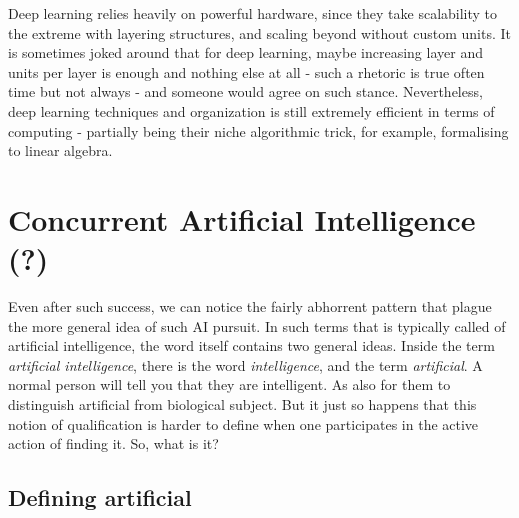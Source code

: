 Deep learning relies heavily on powerful hardware, since they take scalability to the extreme with layering structures, and scaling beyond without custom units. It is sometimes joked around that for deep learning, maybe increasing layer and units per layer is enough and nothing else at all - such a rhetoric is true often time but not always - and someone would agree on such stance. Nevertheless, deep learning techniques and organization is still extremely efficient in terms of computing - partially being their niche algorithmic trick, for example, formalising to linear algebra. 

\section{Concurrent Artificial Intelligence (?)}

Even after such success, we can notice the fairly abhorrent pattern that plague the more general idea of such AI pursuit. In such terms that is typically called of artificial intelligence, the word itself contains two general ideas. Inside the term \textit{artificial intelligence}, there is the word \textit{intelligence}, and the term \textit{artificial}. A normal person will tell you that they are intelligent. As also for them to distinguish artificial from biological subject. But it just so happens that this notion of qualification is harder to define when one participates in the active action of finding it. So, what is it? 

\subsection{Defining artificial}

